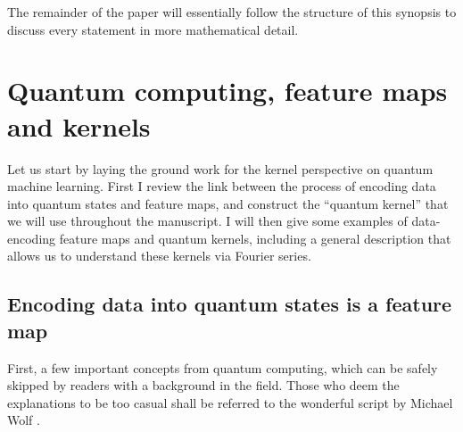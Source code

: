 \documentclass[aps, reprint, onecolumn, nofootinbib, longbibliography]{revtex4-2}
\begin{document}
The remainder of the paper will essentially follow the structure of this synopsis to discuss every statement in more mathematical detail. 


\section{Quantum computing, feature maps and kernels}\label{sec:definitions}

Let us start by laying the ground work for the kernel perspective on quantum machine learning. First I review the link between the process of encoding data into quantum states and feature maps, and construct the ``quantum kernel'' that we will use throughout the manuscript. I will then give some examples of data-encoding feature maps and quantum kernels, including a general description that allows us to understand these kernels via Fourier series. 

\subsection{Encoding data into quantum states is a feature map}\label{ssec:encoding_feat_map}

First, a few important concepts from quantum computing, which can be safely skipped by readers with a background in the field. Those who deem the explanations to be too casual shall be referred to the wonderful script by Michael Wolf \citep{wolf}.
\end{document}
